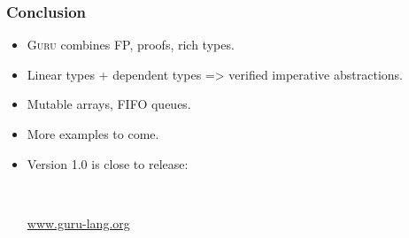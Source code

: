 \documentclass[11pt]{beamer}
\begin{document}
\begin{frame}
\frametitle{Conclusion}

\begin{itemize}
\item \textsc{Guru} combines FP, proofs, rich types.
\item Linear types + dependent types => verified imperative abstractions.
\item Mutable arrays, FIFO queues.
\item More examples to come.
\item Version 1.0 is close to release:

\ 

\begin{center}
\Large
\textcolor{blue}{\url{www.guru-lang.org}}
\end{center}

\end{itemize}

\end{frame}
\end{document}
